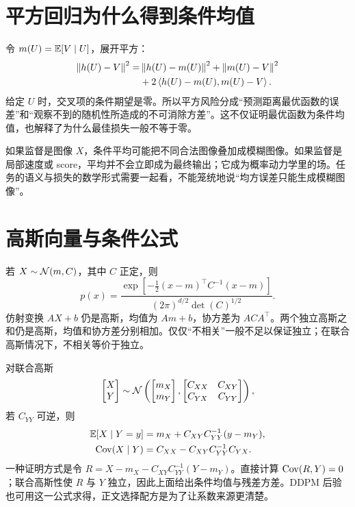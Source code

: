 \section{平方回归为什么得到条件均值}
令 $m(U)=\mathbb{E}[V\mid U]$，展开平方：
\begin{align}
 \left\lVert h(U)-V\right\rVert^2=&\left\lVert h(U)-m(U)\right\rVert^2+\left\lVert m(U)-V\right\rVert^2\\
 &+2\left\langle h(U)-m(U),m(U)-V\right\rangle.
\end{align}
给定 $U$ 时，交叉项的条件期望是零。所以平方风险分成“预测距离最优函数的误差”和“观察不到的随机性所造成的不可消除方差”。这不仅证明最优函数为条件均值，也解释了为什么最佳损失一般不等于零。

如果监督是图像 $X$，条件平均可能把不同合法图像叠加成模糊图像。如果监督是局部速度或 score，平均并不会立即成为最终输出；它成为概率动力学里的场。任务的语义与损失的数学形式需要一起看，不能笼统地说“均方误差只能生成模糊图像”。

\section{高斯向量与条件公式}
若 $X\sim\mathcal{N}(m,C)$，其中 $C$ 正定，则
\begin{equation}
 p(x)=\frac{\exp[-\tfrac12(x-m)^\top C^{-1}(x-m)]}{(2\pi)^{d/2}\det(C)^{1/2}}.
\end{equation}
仿射变换 $AX+b$ 仍是高斯，均值为 $Am+b$，协方差为 $ACA^\top$。两个独立高斯之和仍是高斯，均值和协方差分别相加。仅仅“不相关”一般不足以保证独立；在联合高斯情况下，不相关等价于独立。

对联合高斯
\begin{equation}
 \begin{bmatrix}X\\Y\end{bmatrix}\sim\mathcal{N}\left(
 \begin{bmatrix}m_X\\m_Y\end{bmatrix},
 \begin{bmatrix}C_{XX}&C_{XY}\\C_{YX}&C_{YY}\end{bmatrix}\right),
\end{equation}
若 $C_{YY}$ 可逆，则
\begin{align}
 \mathbb{E}[X\mid Y=y]&=m_X+C_{XY}C_{YY}^{-1}(y-m_Y),\\
 \operatorname{Cov}(X\mid Y)&=C_{XX}-C_{XY}C_{YY}^{-1}C_{YX}.
\end{align}
一种证明方式是令 $R=X-m_X-C_{XY}C_{YY}^{-1}(Y-m_Y)$。直接计算 $\operatorname{Cov}(R,Y)=0$；联合高斯性使 $R$ 与 $Y$ 独立，因此上面给出条件均值与残差方差。DDPM 后验也可用这一公式求得，正文选择配方是为了让系数来源更清楚。

